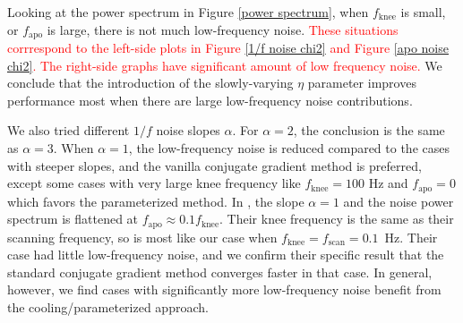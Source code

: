 \documentclass[twocolumn,linenumbers]{aastex631}
\newcommand{\kmh}[1]{\textcolor{red}{#1}}
\begin{document}
Looking at the power spectrum in Figure \ref{power spectrum},
when $f_\text{knee}$ is small, or $f_\text{apo}$ is large, there is not much low-frequency noise.  \kmh{These situations corrrespond to the left-side plots in Figure \ref{1/f noise chi2} and Figure \ref{apo noise chi2}.
The right-side graphs have significant amount of low frequency noise.
}
We conclude that the introduction of the slowly-varying $\eta$ parameter improves performance most when there are large low-frequency noise contributions.


We also tried different $1/f$ noise slopes $\alpha$. For $\alpha=2$, the conclusion is the
same as $\alpha=3$. When $\alpha=1$, the low-frequency noise is reduced compared to the cases with steeper slopes, and
the vanilla conjugate gradient method is preferred, except some cases with very large
knee frequency like $f_\text{knee} = 100$ Hz and $f_\text{apo}=0$ which favors the
parameterized method.
In \citet{2018A&A...620A..59P}, the slope $\alpha = 1$ and  the noise power spectrum is flattened at $f_\text{apo} \approx 0.1 f_\text{knee}$. Their knee frequency is the same as their scanning frequency, so is most like our case when $f_\text{knee}=f_\text{scan}=0.1$~Hz.  Their case had little low-frequency noise, and we confirm their specific result that the standard conjugate gradient method converges faster in that case.  In general, however, we find cases with significantly more low-frequency noise benefit from the cooling/parameterized approach.



\end{document}
